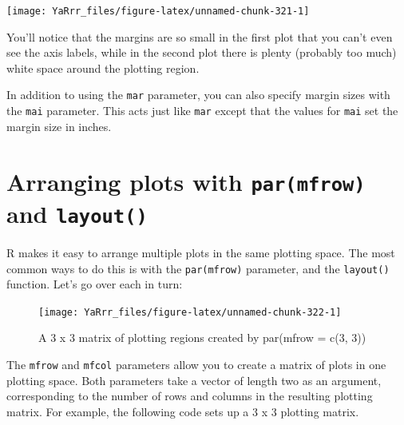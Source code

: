 \documentclass[]{book}
\theoremstyle{definition}
\theoremstyle{definition}
\theoremstyle{remark}
\begin{document}
\begin{center}\texttt{[image: YaRrr\_files/figure-latex/unnamed-chunk-321-1]} \end{center}

You'll notice that the margins are so small in the first plot that you
can't even see the axis labels, while in the second plot there is plenty
(probably too much) white space around the plotting region.

In addition to using the \texttt{mar} parameter, you can also specify
margin sizes with the \texttt{mai} parameter. This acts just like
\texttt{mar} except that the values for \texttt{mai} set the margin size
in inches.

\section{\texorpdfstring{Arranging plots with \texttt{par(mfrow)} and
\texttt{layout()}}{Arranging plots with par(mfrow) and layout()}}\label{arranging-plots-with-parmfrow-and-layout}

R makes it easy to arrange multiple plots in the same plotting space.
The most common ways to do this is with the \texttt{par(mfrow)}
parameter, and the \texttt{layout()} function. Let's go over each in
turn:

\begin{figure}

{\centering \texttt{[image: YaRrr\_files/figure-latex/unnamed-chunk-322-1]} 

}

\caption{A 3 x 3 matrix of plotting regions created by par(mfrow = c(3, 3))}\label{fig:unnamed-chunk-322}
\end{figure}

The \texttt{mfrow} and \texttt{mfcol} parameters allow you to create a
matrix of plots in one plotting space. Both parameters take a vector of
length two as an argument, corresponding to the number of rows and
columns in the resulting plotting matrix. For example, the following
code sets up a 3 x 3 plotting matrix.
\end{document}
